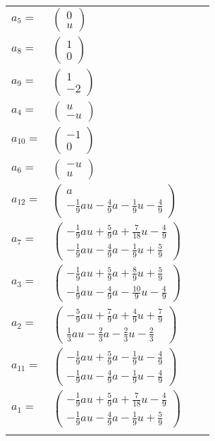 \documentclass[1p]{elsarticle_modified}
\theoremstyle{definition}
\begin{document}
\begin{tabular}{m{7pt} m{180pt} m{7pt} m{180pt} }
\flushright $a_{5}=$&$\begin{pmatrix}0\\u\end{pmatrix}$ \\
\flushright $a_{8}=$&$\begin{pmatrix}1\\0\end{pmatrix}$ \\
\flushright $a_{9}=$&$\begin{pmatrix}1\\-2\end{pmatrix}$ \\
\flushright $a_{4}=$&$\begin{pmatrix}u\\- u\end{pmatrix}$ \\
\flushright $a_{10}=$&$\begin{pmatrix}-1\\0\end{pmatrix}$ \\
\flushright $a_{6}=$&$\begin{pmatrix}- u\\u\end{pmatrix}$ \\
\flushright $a_{12}=$&$\begin{pmatrix}a\\-\frac{1}{9} a u-\frac{4}{9} a-\frac{1}{9} u-\frac{4}{9}\end{pmatrix}$ \\
\flushright $a_{7}=$&$\begin{pmatrix}-\frac{1}{9} a u+\frac{5}{9} a+\frac{7}{18} u-\frac{4}{9}\\-\frac{1}{9} a u-\frac{4}{9} a-\frac{1}{9} u+\frac{5}{9}\end{pmatrix}$ \\
\flushright $a_{3}=$&$\begin{pmatrix}-\frac{1}{9} a u+\frac{5}{9} a+\frac{8}{9} u+\frac{5}{9}\\-\frac{1}{9} a u-\frac{4}{9} a-\frac{10}{9} u-\frac{4}{9}\end{pmatrix}$ \\
\flushright $a_{2}=$&$\begin{pmatrix}-\frac{5}{9} a u+\frac{7}{9} a+\frac{4}{9} u+\frac{7}{9}\\\frac{1}{3} a u-\frac{2}{3} a-\frac{2}{3} u-\frac{2}{3}\end{pmatrix}$ \\
\flushright $a_{11}=$&$\begin{pmatrix}-\frac{1}{9} a u+\frac{5}{9} a-\frac{1}{9} u-\frac{4}{9}\\-\frac{1}{9} a u-\frac{4}{9} a-\frac{1}{9} u-\frac{4}{9}\end{pmatrix}$ \\
\flushright $a_{1}=$&$\begin{pmatrix}-\frac{1}{9} a u+\frac{5}{9} a+\frac{7}{18} u-\frac{4}{9}\\-\frac{1}{9} a u-\frac{4}{9} a-\frac{1}{9} u+\frac{5}{9}\end{pmatrix}$\\&\end{tabular}
\end{document}
